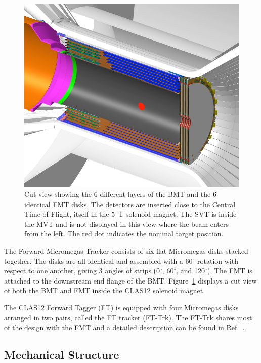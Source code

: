 \begin{figure}[htb]
 \includegraphics[width=1.0\columnwidth,keepaspectratio]{images/fig1}
 \caption{Cut view showing the 6 different layers of the BMT and the 6 identical FMT disks. The detectors are inserted
   close to the Central Time-of-Flight, itself in the 5~T solenoid magnet. The SVT is inside the MVT and is not displayed in
   this view where the beam enters from the left. The red dot indicates the nominal target position.}
 \label{fig:mm-fig1}
\end{figure}

The Forward Micromegas Tracker consists of six flat Micromegas disks stacked together. The disks are all identical and
assembled with a 60$^\circ$ rotation with respect to one another, giving 3 angles of strips (0$^\circ$, 60$^\circ$, and
120$^\circ$). The FMT is attached to the downstream end flange of the BMT. Figure~\ref{fig:mm-fig1} displays a cut view
of both the BMT and FMT inside the CLAS12 solenoid magnet.

The CLAS12 Forward Tagger (FT) is equipped with four Micromegas disks arranged in two pairs, called the FT
tracker (FT-Trk). The FT-Trk shares most of the design with the FMT and a detailed description can be found in
Ref.~\cite{ft-nim}.

\subsection{Mechanical Structure}

